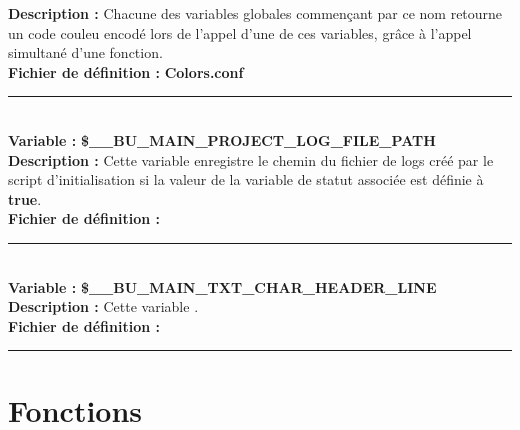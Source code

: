 \documentclass[a4paper,10pt]{article}
\begin{document}
\textbf{Description :} Chacune des variables globales commençant par ce nom retourne un code couleu encodé lors de l'appel d'une de ces variables, grâce à l'appel simultané d'une fonction.\\[1\baselineskip]

\textbf{Fichier de définition :} \textbf{\color{lime}Colors.conf\color{white}}\\[1\baselineskip]



\color{orange}\par\noindent\rule{\textwidth}{0.4pt}\color{white}\\[1\baselineskip]

\textbf{Variable :} \textbf{\color{orange}\$\_\_BU\_MAIN\_PROJECT\_LOG\_FILE\_PATH\color{white}}\\[1\baselineskip]

\textbf{Description :} Cette variable enregistre le chemin du fichier de logs créé par le script d'initialisation si la valeur de la variable de statut associée est définie à \textbf{\color{gray}true\color{white}}.\\[1\baselineskip]

\textbf{Fichier de définition :} \\[1\baselineskip]



\color{orange}\par\noindent\rule{\textwidth}{0.4pt}\color{white}\\[1\baselineskip]

\textbf{Variable :} \textbf{\color{orange}\$\_\_BU\_MAIN\_TXT\_CHAR\_HEADER\_LINE\color{white}}\\[1\baselineskip]

\textbf{Description :} Cette variable .\\[1\baselineskip]

\textbf{Fichier de définition :} \\[1\baselineskip]



\color{red}\par\noindent\rule{\textwidth}{0.4pt}\color{white}

\color{red}
\section{Fonctions}\color{white}

\color{green}
\end{document}
